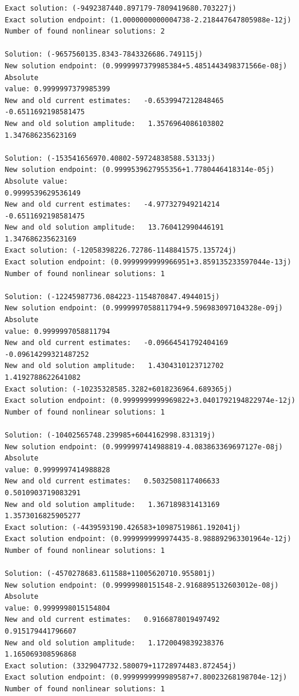 \documentclass[11pt]{article}
\begin{document}
    \begin{Verbatim}[commandchars=\\\{\}]
Exact solution: (-9492387440.897179-7809419680.703227j)
Exact solution endpoint: (1.0000000000004738-2.218447647805988e-12j)
Number of found nonlinear solutions: 2

Solution: (-9657560135.8343-7843326686.749115j)
New solution endpoint: (0.9999997379985384+5.4851443498371566e-08j) Absolute
value: 0.9999997379985399
New and old current estimates:   -0.6539947212848465    -0.6511692198581475
New and old solution amplitude:   1.3576964086103802    1.347686235623169

Solution: (-153541656970.40802-59724838588.53133j)
New solution endpoint: (0.9999539627955356+1.7780446418314e-05j) Absolute value:
0.9999539629536149
New and old current estimates:   -4.977327949214214    -0.6511692198581475
New and old solution amplitude:   13.760412990446191    1.347686235623169
Exact solution: (-12058398226.72786-1148841575.135724j)
Exact solution endpoint: (0.9999999999966951+3.859135233597044e-13j)
Number of found nonlinear solutions: 1

Solution: (-12245987736.084223-1154870847.4944015j)
New solution endpoint: (0.9999997058811794+9.596983097104328e-09j) Absolute
value: 0.9999997058811794
New and old current estimates:   -0.09664541792404169    -0.09614299321487252
New and old solution amplitude:   1.4304310123712702    1.4192788622641082
Exact solution: (-10235328585.3282+6018236964.689365j)
Exact solution endpoint: (0.9999999999969822+3.0401792194822974e-12j)
Number of found nonlinear solutions: 1

Solution: (-10402565748.239985+6044162998.831319j)
New solution endpoint: (0.9999997414988819-4.083863369697127e-08j) Absolute
value: 0.9999997414988828
New and old current estimates:   0.5032508117406633    0.5010903719083291
New and old solution amplitude:   1.367189831413169    1.3573016825905277
Exact solution: (-4439593190.426583+10987519861.192041j)
Exact solution endpoint: (0.9999999999974435-8.988892963301964e-12j)
Number of found nonlinear solutions: 1

Solution: (-4570278683.611588+11005620710.955801j)
New solution endpoint: (0.99999980151548-2.9168895132603012e-08j) Absolute
value: 0.9999998015154804
New and old current estimates:   0.9166878019497492    0.915179441796607
New and old solution amplitude:   1.1720049839238376    1.165069308596868
Exact solution: (3329047732.580079+11728974483.872454j)
Exact solution endpoint: (0.9999999999989587+7.80023268198704e-12j)
Number of found nonlinear solutions: 1


\end{Verbatim}
\end{document}
